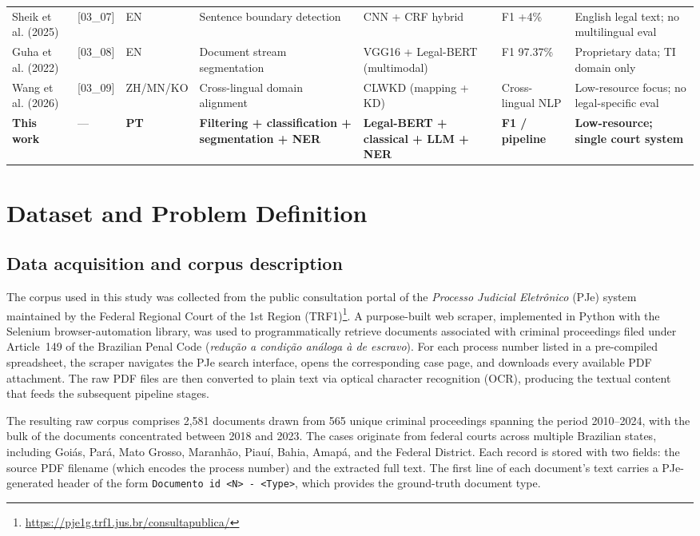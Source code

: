 \documentclass[preprint,a4paper,fleqn]{cas-dc}
\begin{document}
\begin{table}[t]
\begin{tabular}{p{3.2cm} p{1.1cm} p{1.1cm} p{2.3cm} p{2.3cm} p{1.4cm} p{3.0cm}}
Sheik et al. (2025) & [03\_07] & EN & Sentence boundary detection & CNN + CRF hybrid & F1 +4\% & English legal text; no multilingual eval \\
Guha et al. (2022) & [03\_08] & EN & Document stream segmentation & VGG16 + Legal-BERT (multimodal) & F1 97.37\% & Proprietary data; TI domain only \\
Wang et al. (2026) & [03\_09] & ZH/MN/KO & Cross-lingual domain alignment & CLWKD (mapping + KD) & Cross-lingual NLP & Low-resource focus; no legal-specific eval \\
\midrule
\textbf{This work} & --- & \textbf{PT} & \textbf{Filtering + classification + segmentation + NER} & \textbf{Legal-BERT + classical + LLM + NER} & \textbf{F1 / pipeline} & \textbf{Low-resource; single court system} \\
\bottomrule
\end{tabular}
\end{table}

\section{Dataset and Problem Definition}
\label{sec:data}
\subsection{Data acquisition and corpus description}
\label{subsec:corpus}

The corpus used in this study was collected from the public consultation portal of the \textit{Processo Judicial Eletr\^onico} (PJe) system maintained by the Federal Regional Court of the 1st Region (TRF1)\footnote{\url{https://pje1g.trf1.jus.br/consultapublica/}}. A purpose-built web scraper, implemented in Python with the Selenium browser-automation library, was used to programmatically retrieve documents associated with criminal proceedings filed under Article~149 of the Brazilian Penal Code (\textit{redu\c{c}\~ao a condi\c{c}\~ao an\'aloga \`a de escravo}). For each process number listed in a pre-compiled spreadsheet, the scraper navigates the PJe search interface, opens the corresponding case page, and downloads every available PDF attachment. The raw PDF files are then converted to plain text via optical character recognition (OCR), producing the textual content that feeds the subsequent pipeline stages.

The resulting raw corpus comprises 2,581 documents drawn from 565 unique criminal proceedings spanning the period 2010--2024, with the bulk of the documents concentrated between 2018 and 2023. The cases originate from federal courts across multiple Brazilian states, including Goi\'as, Par\'a, Mato Grosso, Maranh\~ao, Piau\'i, Bahia, Amap\'a, and the Federal District. Each record is stored with two fields: the source PDF filename (which encodes the process number) and the extracted full text. The first line of each document's text carries a PJe-generated header of the form \texttt{Documento id <N> - <Type>}, which provides the ground-truth document type.
\end{document}
